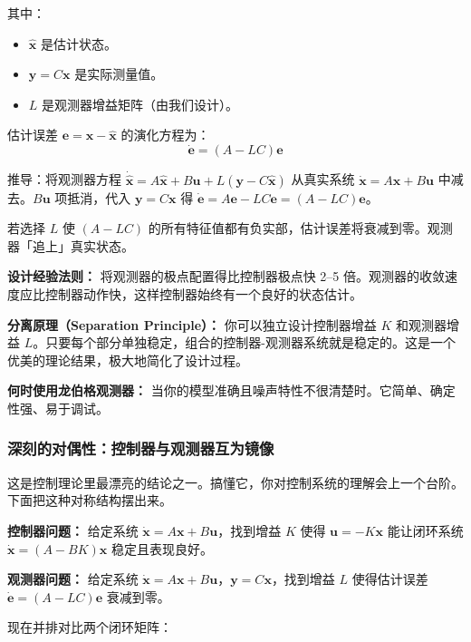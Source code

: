其中：
\begin{itemize}[nosep]
    \item $\hat{\mathbf{x}}$ 是估计状态。
    \item $\mathbf{y} = C\mathbf{x}$ 是实际测量值。
    \item $L$ 是观测器增益矩阵（由我们设计）。
\end{itemize}

估计误差 $\mathbf{e} = \mathbf{x} - \hat{\mathbf{x}}$ 的演化方程为：
\begin{equation}
\dot{\mathbf{e}} = (A - LC)\mathbf{e}
\end{equation}

推导：将观测器方程 $\dot{\hat{\mathbf{x}}} = A\hat{\mathbf{x}} + B\mathbf{u} + L(\mathbf{y} - C\hat{\mathbf{x}})$ 从真实系统 $\dot{\mathbf{x}} = A\mathbf{x} + B\mathbf{u}$ 中减去。$B\mathbf{u}$ 项抵消，代入 $\mathbf{y} = C\mathbf{x}$ 得 $\dot{\mathbf{e}} = A\mathbf{e} - LC\mathbf{e} = (A - LC)\mathbf{e}$。

若选择 $L$ 使 $(A - LC)$ 的所有特征值都有负实部，估计误差将衰减到零。观测器「追上」真实状态。

\textbf{设计经验法则：} 将观测器的极点配置得比控制器极点快 2--5 倍。观测器的收敛速度应比控制器动作快，这样控制器始终有一个良好的状态估计。

\textbf{分离原理（Separation Principle）：} 你可以独立设计控制器增益 $K$ 和观测器增益 $L$。只要每个部分单独稳定，组合的控制器-观测器系统就是稳定的。这是一个优美的理论结果，极大地简化了设计过程。

\textbf{何时使用龙伯格观测器：} 当你的模型准确且噪声特性不很清楚时。它简单、确定性强、易于调试。

\subsubsection{深刻的对偶性：控制器与观测器互为镜像}

这是控制理论里最漂亮的结论之一。搞懂它，你对控制系统的理解会上一个台阶。下面把这种对称结构摆出来。

\textbf{控制器问题：} 给定系统 $\dot{\mathbf{x}} = A\mathbf{x} + B\mathbf{u}$，找到增益 $K$ 使得 $\mathbf{u} = -K\mathbf{x}$ 能让闭环系统 $\dot{\mathbf{x}} = (A - BK)\mathbf{x}$ 稳定且表现良好。

\textbf{观测器问题：} 给定系统 $\dot{\mathbf{x}} = A\mathbf{x} + B\mathbf{u}$，$\mathbf{y} = C\mathbf{x}$，找到增益 $L$ 使得估计误差 $\dot{\mathbf{e}} = (A - LC)\mathbf{e}$ 衰减到零。

现在并排对比两个闭环矩阵：

